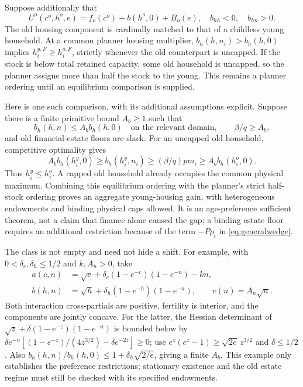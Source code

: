 \documentclass[11pt]{article}
\begin{document}
Suppose additionally that
\begin{equation}
 U^o(c^o,h^o,e)=f_o(c^o)+b(h^o,0)+B_o(e),\quad
 b_{hh}<0,\quad b_{hn}>0.\label{eq:generalageclass}
\end{equation}
The old housing component is cardinally matched to that of a childless young household. At a common planner housing multiplier, $b_h(h,n_i)>b_h(h,0)$ implies $h_i^{y,F}\ge h_i^{o,F}$, strictly whenever the old counterpart is uncapped. If the stock is below total retained capacity, some old household is uncapped, so the planner assigns more than half the stock to the young. This remains a planner ordering until an equilibrium comparison is supplied.

Here is one such comparison, with its additional assumptions explicit. Suppose there is a finite primitive bound $A_b\ge1$ such that
\begin{equation}
 b_h(h,n)\le A_b b_h(h,0)\quad\text{on the relevant domain},\qquad
 \beta/q\ge A_b,\label{eq:boundedchildpremium}
\end{equation}
and old financial-estate floors are slack. For an uncapped old household, competitive optimality gives
\[
 A_b b_h(h_i^y,0)\ge b_h(h_i^y,n_i)
 \ge (\beta/q)p m_i\ge A_b b_h(h_i^o,0).
\]
Thus $h_i^y\le h_i^o$. A capped old household already occupies the common physical maximum. Combining this equilibrium ordering with the planner's strict half-stock ordering proves an aggregate young-housing gain, with heterogeneous endowments and binding physical caps allowed. It is an age-preference sufficient theorem, not a claim that finance alone caused the gap; a binding estate floor requires an additional restriction because of the term $-P\rho_i$ in \eqref{eq:generalwedge}.

The class is not empty and need not hide a shift. For example, with $0<\delta_c,\delta_h\le1/2$ and $k,A_n>0$, take
\[
\begin{split}
 a(c,n)&=\sqrt c+\delta_c(1-e^{-c})(1-e^{-n})-kn,\\
 b(h,n)&=\sqrt h+\delta_h(1-e^{-h})(1-e^{-n}),\qquad
 v(n)=A_n\sqrt n.
\end{split}
\]
Both interaction cross-partials are positive, fertility is interior, and the components are jointly concave. For the latter, the Hessian determinant of
$\sqrt z+\delta(1-e^{-z})(1-e^{-n})$ is bounded below by
$\delta e^{-n}[(1-e^{-z})/(4z^{3/2})-\delta e^{-2z}]\ge0$;
use $e^z(e^z-1)\ge\sqrt{2e}\,z^{3/2}$ and $\delta\le1/2$.
Also $b_h(h,n)/b_h(h,0)\le1+\delta_h\sqrt{2/e}$, giving a finite $A_b$. This example only establishes the preference restrictions; stationary existence and the old estate regime must still be checked with its specified endowments.
\end{document}
